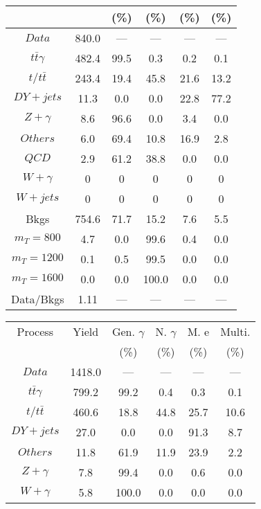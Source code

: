 \begin{figure}
\begin{minipage}[c]{0.32\textwidth}
{\begin{tabular}{cccccc}
 &  & (\%) & (\%) & (\%) & (\%)  \\
\hline
                                                                      $ Data $ &  840.0 &  --- &  --- &  --- &  ---\\
$ t\bar{t}\gamma $ &  482.4 &  99.5 &  0.3 &  0.2 &  0.1\\
$ t/t\bar{t} $ &  243.4 &  19.4 &  45.8 &  21.6 &  13.2\\
$ DY+jets $ &  11.3 &  0.0 &  0.0 &  22.8 &  77.2\\
$ Z+\gamma $ &  8.6 &  96.6 &  0.0 &  3.4 &  0.0\\
$ Others $ &  6.0 &  69.4 &  10.8 &  16.9 &  2.8\\
$ QCD $ &  2.9 &  61.2 &  38.8 &  0.0 &  0.0\\
$ W+\gamma $ &  0 &  0 &  0 &  0 &  0\\
$ W+jets $ &  0 &  0 &  0 &  0 &  0\\
Bkgs &  754.6 &  71.7 &  15.2 &  7.6 &  5.5\\
$ m_{T} = 800 $ &  4.7 &  0.0 &  99.6 &  0.4 &  0.0\\
$ m_{T} = 1200 $ &  0.1 &  0.5 &  99.5 &  0.0 &  0.0\\
$ m_{T} = 1600 $ &  0.0 &  0.0 &  100.0 &  0.0 &  0.0\\
Data/Bkgs &  1.11 &  --- &  --- &  --- &  ---\\
\hline
\end{tabular}
}
\end{minipage}
\begin{minipage}[c]{0.32\textwidth}
\centering
\tiny{
\begin{tabular}{cccccc}
\hline
Process & Yield & Gen. $\gamma$ & N. $\gamma$ & M. e & Multi. \\
 &  & (\%) & (\%) & (\%) & (\%)  \\
\hline
                                                                      $ Data $ &  1418.0 &  --- &  --- &  --- &  ---\\
$ t\bar{t}\gamma $ &  799.2 &  99.2 &  0.4 &  0.3 &  0.1\\
$ t/t\bar{t} $ &  460.6 &  18.8 &  44.8 &  25.7 &  10.6\\
$ DY+jets $ &  27.0 &  0.0 &  0.0 &  91.3 &  8.7\\
$ Others $ &  11.8 &  61.9 &  11.9 &  23.9 &  2.2\\
$ Z+\gamma $ &  7.8 &  99.4 &  0.0 &  0.6 &  0.0\\
$ W+\gamma $ &  5.8 &  100.0 &  0.0 &  0.0 &  0.0\\

\end{tabular}}
\end{minipage}
\end{figure}

